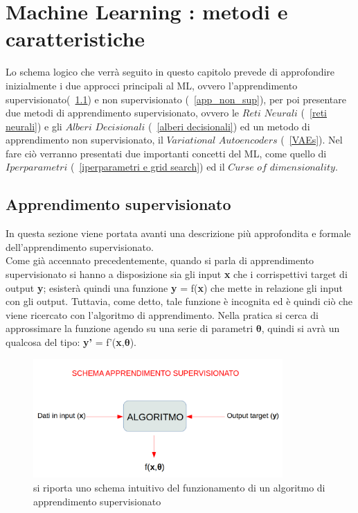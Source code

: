 \section{Machine Learning : metodi e caratteristiche}
\label{ML: metodi e caratteristiche}

Lo schema logico che verrà seguito in questo capitolo prevede di approfondire inizialmente i due approcci principali al ML, ovvero l'apprendimento supervisionato(~\ref{app_sup}) e non supervisionato (~\ref{app_non_sup}), per poi presentare due metodi di apprendimento supervisionato, ovvero le $\textit{Reti Neurali}$ (~\ref{reti neurali}) e gli $\textit{Alberi Decisionali}$ (~\ref{alberi decisionali}) ed un metodo di apprendimento non supervisionato, il $\textit{Variational Autoencoders}$ (~\ref{VAEs}). Nel fare ciò verranno presentati due importanti concetti del ML, come quello di $\textit{Iperparametri}$ (~\ref{iperparametri e grid search}) ed il $\textit{Curse of dimensionality}$.

\subsection{Apprendimento supervisionato}
\label{app_sup}
In questa sezione viene portata avanti una descrizione più approfondita e formale dell'apprendimento supervisionato.\\
Come già accennato precedentemente, quando si parla di apprendimento supervisionato si hanno a disposizione sia gli input \textbf{x} che i corrispettivi target di output \textbf{y}; esisterà quindi una funzione 
\textbf{y} = f(\textbf{x}) che mette in relazione gli input con gli output. Tuttavia, come detto, tale funzione è incognita ed è quindi ciò che viene ricercato con l'algoritmo di apprendimento.
Nella pratica si cerca di approssimare la funzione agendo su una serie di parametri $\bm{\theta}$, quindi si avrà un qualcosa del tipo: \textbf{y'} = f'(\textbf{x},$\bm{\theta}$). \\

\begin{figure}[h!]
	\centering
	\includegraphics[width=0.85\textwidth]{figs/App_sup.png}
	\caption{si riporta uno schema intuitivo del funzionamento di un algoritmo di apprendimento supervisionato}
	\label{fig:schema_app_sup}
\end{figure}


